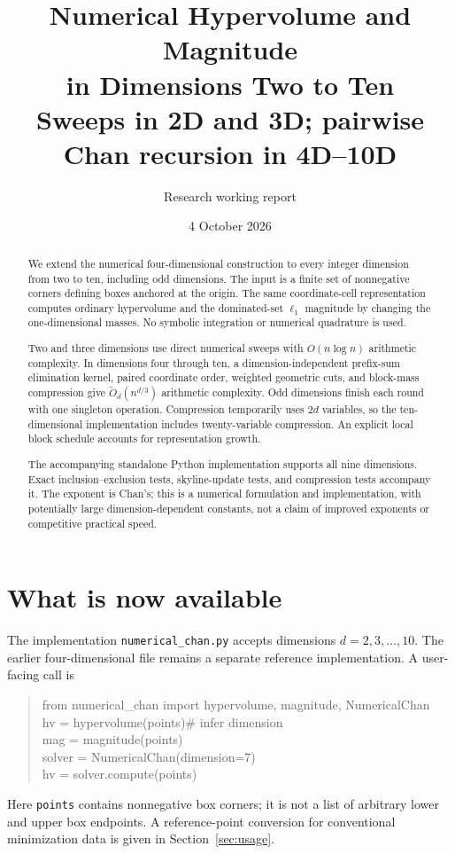 \documentclass[12pt,a4paper]{article}
\title{Numerical Hypervolume and Magnitude\\in Dimensions Two to Ten\\[.5em]
\large Sweeps in 2D and 3D; pairwise Chan recursion in 4D--10D}
\author{Research working report}
\date{4 October 2026}
\newcommand{\wtO}{\widetilde O}
\newcommand{\1}{\mathbf1}
\begin{document}
\maketitle
\begin{abstract}
We extend the numerical four-dimensional construction to every integer
dimension from two to ten, including odd dimensions. The input is a finite
set of nonnegative corners defining boxes anchored at the origin. The same
coordinate-cell representation computes ordinary hypervolume and the
dominated-set $\ell_1$ magnitude by changing the one-dimensional masses.
No symbolic integration or numerical quadrature is used.

Two and three dimensions use direct numerical sweeps with
$O(n\log n)$ arithmetic complexity. In dimensions four through ten, a
dimension-independent prefix-sum elimination kernel, paired coordinate
order, weighted geometric cuts, and block-mass compression give
$\wtO_d(n^{d/3})$ arithmetic complexity. Odd dimensions finish each round
with one singleton operation. Compression temporarily uses $2d$ variables,
so the ten-dimensional implementation includes twenty-variable compression.
An explicit local block schedule accounts for representation growth.

The accompanying standalone Python implementation supports all nine
dimensions. Exact inclusion--exclusion tests, skyline-update tests, and
compression tests accompany it. The exponent is Chan's; this is a numerical
formulation and implementation, with potentially large dimension-dependent
constants, not a claim of improved exponents or competitive practical speed.
\end{abstract}
\newpage
\tableofcontents
\newpage

\section{What is now available}
The implementation \texttt{numerical\_chan.py} accepts dimensions
$d=2,3,\ldots,10$. The earlier four-dimensional file remains a separate
reference implementation. A user-facing call is
\begin{quote}\ttfamily\small
from numerical\_chan import hypervolume, magnitude, NumericalChan\\
hv = hypervolume(points)\hfill\# infer dimension\\
mag = magnitude(points)\\
solver = NumericalChan(dimension=7)\\
hv = solver.compute(points)
\end{quote}
Here \texttt{points} contains nonnegative box corners; it is not a list
of arbitrary lower and upper box endpoints. A reference-point conversion
for conventional minimization data is given in Section~\ref{sec:usage}.
\end{document}
